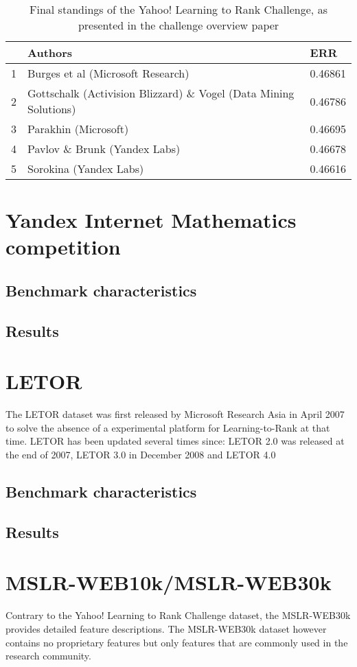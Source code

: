 \begin{table}
\begin{tabular}{l|p{6.3cm}|l}
 & Authors & ERR \\
 \hline 
1 & Burges et al (Microsoft Research) & 0.46861 \\ 
2 & Gottschalk (Activision Blizzard) \& Vogel (Data Mining Solutions) & 0.46786 \\ 
3 & Parakhin (Microsoft) & 0.46695 \\ 
4 & Pavlov \& Brunk (Yandex Labs) & 0.46678 \\ 
5 & Sorokina (Yandex Labs) & 0.46616 \\ 
\end{tabular}
\caption{Final standings of the Yahoo! Learning to Rank Challenge, as presented in the challenge overview paper\cite{Chapelle2011a}}
\label{fig:yahoo_results}
\end{table}



\chapter{Yandex Internet Mathematics competition}
\section{Benchmark characteristics}
\section{Results}



\chapter{LETOR}
The LETOR dataset was first released by Microsoft Research Asia in April 2007 to solve the absence of a experimental platform for Learning-to-Rank at that time. LETOR has been updated several times since: LETOR 2.0 was released at the end of 2007, LETOR 3.0 in December 2008 and LETOR 4.0
\section{Benchmark characteristics}
\section{Results}



\chapter{MSLR-WEB10k/MSLR-WEB30k}
Contrary to the Yahoo! Learning to Rank Challenge dataset, the MSLR-WEB30k provides detailed feature descriptions. The MSLR-WEB30k dataset however contains no proprietary features but only features that are commonly used in the research community.
